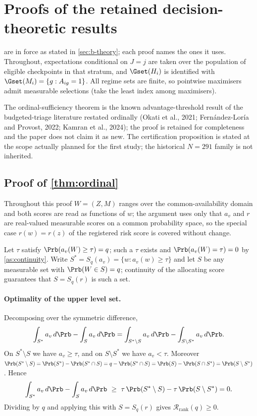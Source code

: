 \section{Proofs of the retained decision-theoretic results}
\label{app:b-proofs}

 are in force as stated in
\cref{sec:b-theory}; each proof names the ones it uses.  Throughout,
expectations conditional on $J=j$ are taken over the population of eligible
checkpoints in that stratum, and $\Gset(H_i)$ is identified with
$\Gset(M_i)=\{g:A_{ig}=1\}$.  All regime sets are finite, so pointwise
maximisers admit measurable selections (take the least index among maximisers).

The ordinal-sufficiency theorem is the known advantage-threshold result of the
budgeted-triage literature restated ordinally (Okati et al., 2021;
Fern\'andez-Lor\'ia and Provost, 2022; Kamran et al., 2024); the proof is
retained for completeness and the paper does not claim it as new.  The
certification proposition is stated at the scope actually planned for the
first study; the historical $N=291$ family is not inherited.

\subsection{Proof of \texorpdfstring{\cref{thm:ordinal}}{the ordinal-sufficiency theorem}}

Throughout this proof $W=(Z,M)$ ranges over the common-availability domain and
both scores are read as functions of $w$; the argument uses only that $a_v$ and
$r$ are real-valued measurable scores on a common probability space, so the
special case $r(w)=r(z)$ of the registered risk score is covered without change.

Let $\tau$ satisfy $\Prb(a_v(W)\ge\tau)=q$; such a $\tau$ exists and
$\Prb(a_v(W)=\tau)=0$ by \cref{as:continuity}.  Write
$S^*=S_q(a_v)=\{w:a_v(w)\ge\tau\}$ and let $S$ be any measurable set with
$\Prb(W\in S)=q$; continuity of the allocating score guarantees that
$S=S_q(r)$ is such a set.

\paragraph{Optimality of the upper level set.}
Decomposing over the symmetric difference,
\begin{equation}
 \int_{S^*}a_v\,d\Prb-\int_{S}a_v\,d\Prb
 =\int_{S^*\setminus S}a_v\,d\Prb-\int_{S\setminus S^*}a_v\,d\Prb .
 \label{eq:symdiff}
\end{equation}
On $S^*\setminus S$ we have $a_v\ge\tau$, and on $S\setminus S^*$ we have
$a_v<\tau$.  Moreover $\Prb(S^*\setminus S)=\Prb(S^*)-\Prb(S^*\cap S)
=q-\Prb(S^*\cap S)=\Prb(S)-\Prb(S\cap S^*)=\Prb(S\setminus S^*)$.  Hence
\begin{equation}
 \int_{S^*}a_v\,d\Prb-\int_{S}a_v\,d\Prb
 \ \ge\ \tau\,\Prb(S^*\setminus S)-\tau\,\Prb(S\setminus S^*)=0 .
 \label{eq:np}
\end{equation}
Dividing by $q$ and applying this with $S=S_q(r)$ gives
$\mathcal R_{\mathrm{rank}}(q)\ge0$.

